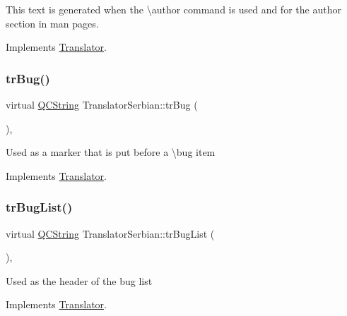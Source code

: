 This text is generated when the \textbackslash{}author command is used and for the author section in man pages. 

Implements \mbox{\hyperlink{class_translator}{Translator}}.

\mbox{\label{class_translator_serbian_ac9bfcae2a17cfd3b27facb4f9657a23f}} 
\subsubsection{\texorpdfstring{trBug()}{trBug()}}
{\footnotesize\ttfamily virtual \mbox{\hyperlink{class_q_c_string}{Q\+C\+String}} Translator\+Serbian\+::tr\+Bug (\begin{DoxyParamCaption}{ }\end{DoxyParamCaption})\hspace{0.3cm}{\ttfamily [inline]}, {\ttfamily [virtual]}}

Used as a marker that is put before a \textbackslash{}bug item 

Implements \mbox{\hyperlink{class_translator}{Translator}}.

\mbox{\label{class_translator_serbian_a7c4b80c5ec6e7a2c95298ec015c014c2}} 
\subsubsection{\texorpdfstring{trBugList()}{trBugList()}}
{\footnotesize\ttfamily virtual \mbox{\hyperlink{class_q_c_string}{Q\+C\+String}} Translator\+Serbian\+::tr\+Bug\+List (\begin{DoxyParamCaption}{ }\end{DoxyParamCaption})\hspace{0.3cm}{\ttfamily [inline]}, {\ttfamily [virtual]}}

Used as the header of the bug list 

Implements \mbox{\hyperlink{class_translator}{Translator}}.

\mbox{\label{class_translator_serbian_ac2ed4d03fc9735018677c5335f40f59f}} 

